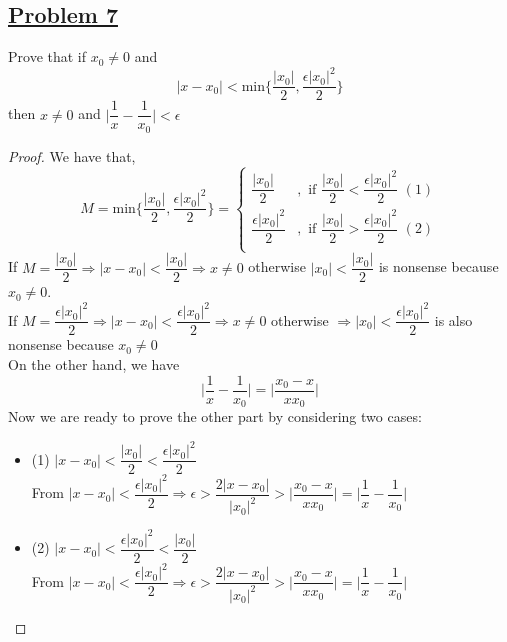 \documentclass[10pt,letterpaper]{article}
\begin{document}
	\subsection*{{\color{purple}\underline{Problem 7}}}
	Prove that if $x_0 \neq 0$ and 
	$$|x - x_0| < \mathrm{min}\bigg\{\dfrac{|x_0|}{2}, \dfrac{\epsilon|x_0|^2}{2} \bigg\}$$
	then $x \neq 0$ and $\bigg|\dfrac{1}{x} - \dfrac{1}{x_0}\bigg| < \epsilon$ 
	\begin{proof}
	We have that,
	$$
	M = \mathrm{min}\bigg\{\dfrac{|x_0|}{2}, \dfrac{\epsilon|x_0|^2}{2} \bigg\} = 	
	\begin{cases} 
		\dfrac{|x_0|}{2} &, \text{ if } \dfrac{|x_0|}{2} < \dfrac{\epsilon|x_0|^2}{2} \, \, (1) \\
		\dfrac{\epsilon|x_0|^2}{2} &, \text{ if } \dfrac{|x_0|}{2} > \dfrac{\epsilon|x_0|^2}{2} \, \, (2) \\
	\end{cases}
	$$
	If $M = \dfrac{|x_0|}{2} \Rightarrow |x - x_0| < \dfrac{|x_0|}{2} \Rightarrow
	x \neq 0$ otherwise $|x_0| < \dfrac{|x_0|}{2}$ is nonsense because $x_0 \neq 0$. \\
	If $M = \dfrac{\epsilon|x_0|^2}{2} \Rightarrow |x - x_0| < \dfrac{\epsilon|x_0|^2}{2}
	\Rightarrow x \neq 0$ otherwise
	$\Rightarrow |x_0| <  \dfrac{\epsilon|x_0|^2}{2}$ is also nonsense because $x_0 \neq 0$ \\
	On the other hand, we have
	$$\bigg|\dfrac{1}{x} - \dfrac{1}{x_0}\bigg| =
	\bigg|\dfrac{x_0 - x}{xx_0}\bigg|
	$$
	Now we are ready to prove the other part by considering two cases:
	\begin{itemize}
		\item (1) $|x - x_0| < \dfrac{|x_0|}{2} < \dfrac{\epsilon|x_0|^2}{2}$ \\
		From $|x - x_0| < \dfrac{\epsilon|x_0|^2}{2} \Rightarrow \epsilon
		> \dfrac{2|x - x_0|}{|x_0|^2} > \bigg|\dfrac{x_0 - x}{xx_0}\bigg| = \bigg|\dfrac{1}{x} - \dfrac{1}{x_0}\bigg|$
		\item (2) $|x - x_0| < \dfrac{\epsilon|x_0|^2}{2} < \dfrac{|x_0|}{2}$ \\
		From $|x - x_0| < \dfrac{\epsilon|x_0|^2}{2} \Rightarrow
		\epsilon > \dfrac{2|x - x_0|}{|x_0|^2} > \bigg|\dfrac{x_0 - x}{xx_0}\bigg| = \bigg|\dfrac{1}{x} - \dfrac{1}{x_0}\bigg|$
	\end{itemize}
	\end{proof}
	
	
\end{document}
